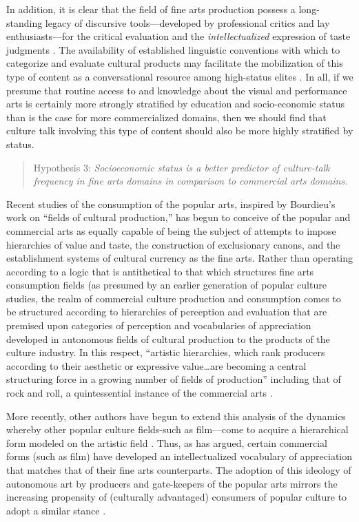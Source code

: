 In addition, it is clear that the field of fine arts production possess a long-standing legacy of discursive tools---developed by professional critics and lay enthusiasts---for the critical evaluation and the \emph{intellectualized} expression of taste judgments \citep{weber77}.  The availability of established linguistic conventions with which to categorize and evaluate cultural products may facilitate the mobilization of this type of content as a conversational resource among high-status elites \citep{dimaggio87}.  In all, if we presume that routine access to and knowledge about the visual and performance arts is certainly more strongly stratified by education and socio-economic status than is the case for more commercialized domains, then we should find that culture talk involving this type of content should also be more highly stratified by status.

\begin{quote}
Hypothesis 3: \emph{Socioeconomic status is a better predictor of culture-talk frequency in fine arts domains in comparison to commercial arts domains.}
\end{quote}

Recent studies of the consumption of the popular arts, inspired by Bourdieu's \citeyearpar{bourdieu93a} work on ``fields of cultural production,'' has begun to conceive of the popular and commercial arts as equally capable of being the subject of attempts to impose hierarchies of value and taste, the construction of exclusionary canons, and the establishment systems of cultural currency as the fine arts. Rather than operating according to a logic that is antithetical to that which structures fine arts consumption fields (as presumed by an earlier generation of popular culture studies, the realm of commercial culture production and consumption comes to be structured according to hierarchies of perception and evaluation that are premised upon categories of perception and vocabularies of appreciation developed in autonomous fields of cultural production to the products of the culture industry.  In this respect, ``artistic hierarchies, which rank producers according to their aesthetic or expressive value{\ldots}are becoming a central structuring force in a growing number of fields of production'' including that of rock and roll, a quintessential instance of the commercial arts \citep[98]{regev94}.  

More recently, other authors have begun to extend this analysis of the dynamics whereby other popular culture fields-such as film---come to acquire a hierarchical form modeled on the artistic field \citep[e.g.][]{allen_lincoln04}. Thus, as \citet{baumann01} has argued, certain commercial forms (such as film) have developed an intellectualized vocabulary of appreciation that matches that of their fine arts counterparts. The adoption of this ideology of autonomous art by producers and gate-keepers of the popular arts mirrors the increasing propensity of  (culturally advantaged) consumers of popular culture to adopt a similar stance \citep{thornton96}. 

